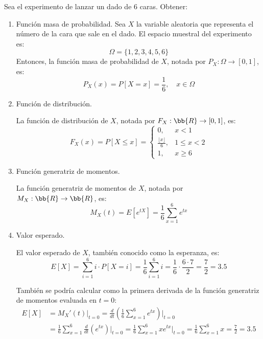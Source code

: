 \begin{ejercicio}
    Sea el experimento de lanzar un dado de 6 caras. Obtener:
    \begin{enumerate}
        \item Función masa de probabilidad.
        Sea $X$ la variable aleatoria que representa el número de la cara que sale en el dado.
        El espacio muestral del experimento es:
        \begin{equation*}
            \Omega = \{1,2,3,4,5,6\}
        \end{equation*}
        Entonces, la función masa de probabilidad de $X$, notada por $P_X : \Omega \to [0,1]$, es:
        \begin{equation*}
            P_X(x) = P[X=x] = \frac{1}{6}, \quad x\in \Omega
        \end{equation*}

        \item Función de distribución.
        
        La función de distribución de $X$, notada por $F_X : \bb{R}\to [0,1]$, es:
        \begin{equation*}
            F_X(x) = P[X\leq x] = \begin{cases}
                0, & x<1 \\
                \frac{\lfloor x\rfloor }{6}, & 1\leq x < 2 \\
                1, & x\geq 6
            \end{cases}
        \end{equation*}
        \item Función generatriz de momentos.
        
        La función generatriz de momentos de $X$, notada por $M_X : \bb{R}\to \bb{R}$, es:
        \begin{equation*}
            M_X(t) = E[e^{tX}] = \frac{1}{6}\sum_{x=1}^{6}e^{tx}
        \end{equation*}

        \item Valor esperado.
        
        El valor esperado de $X$, también conocido como la esperanza, es:
        \begin{equation*}
            E[X] = \sum_{i=1}^{6}i\cdot P[X=i] = \frac{1}{6}\sum_{i=1}^{6}i = \frac{1}{6}\cdot \frac{6\cdot 7}{2} = \frac{7}{2} = 3.5
        \end{equation*}

        También se podría calcular como la primera derivada de la función generatriz de momentos evaluada en $t=0$:
        \begin{align*}
            E[X] &= M_X'(t)\Big|_{t=0} = \frac{d}{dt}\left(\frac{1}{6}\sum_{x=1}^{6}e^{tx}\right)\Big|_{t=0} \\
            &= \frac{1}{6}\sum_{x=1}^{6}\frac{d}{dt}\left(e^{tx}\right)\Big|_{t=0} = \frac{1}{6}\sum_{x=1}^{6}xe^{tx}\Big|_{t=0}  = \frac{1}{6}\sum_{x=1}^{6}x = \frac{7}{2} = 3.5
        \end{align*}


\end{enumerate}
\end{ejercicio}
